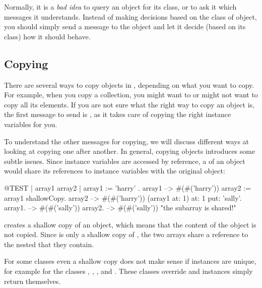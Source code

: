 \documentclass[a4paper,10pt,twoside]{book}
\begin{document}
Normally, it is a \emph{bad idea} to query an object for its class, or to ask it which messages it understands.
Instead of making decisions based on the class of object, you should simply send a message to the object and let it decide (\ie based on its class) how it should behave.

\subsection{Copying}

There are several ways to copy objects in \sq, depending on what you want to copy. For example, when you copy a collection, you might want to or might not want to copy all its elements. If you are not sure what the right way to copy an object is, the first message to send is , as it takes care of copying the right instance variables for you.

To understand the other messages for copying, we will discuss different ways at looking at copying one after another. 
In general, copying objects introduces some subtle issues.
Since instance variables are accessed by reference, a  of an object would share its references to instance variables with the original object:

\begin{code}{@TEST | array1 array2 |}
array1 := { { 'harry' } }.
array1 --> #(#('harry'))
array2 := array1 shallowCopy.
array2 --> #(#('harry'))
(array1 at: 1) at: 1 put: 'sally'.
array1. --> #(#('sally'))
array2. --> #(#('sally'))    "the subarray is shared!"
\end{code}

 creates a shallow copy of an object, which means that the content of the object is not copied.
Since  is only a shallow copy of , the two arrays share a reference to the nested  that they contain.

For some classes even a shallow copy does not make sense if instances are unique, for example for the classes , , ,  and . These classes override  and instances simply return themselves.
\end{document}
